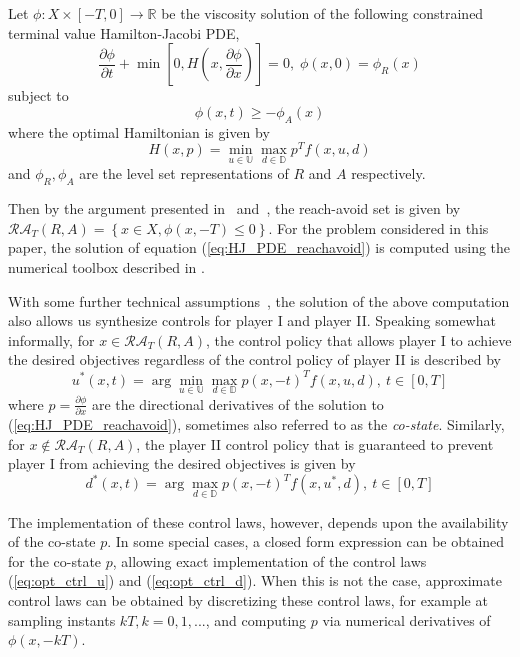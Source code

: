 Let $\phi: X \times [-T,0] \rightarrow \mathbb{R}$ be the viscosity solution of the following constrained terminal value Hamilton-Jacobi PDE,
\begin{equation}
	\label{eq:HJ_PDE_reachavoid}
	\frac{\partial \phi}{\partial t} + \min \left[0, H\left(x,\frac{\partial \phi}{\partial x}\right)\right] = 0,\;\phi(x,0) = \phi_R(x)	 
\end{equation}
subject to 
$$\phi(x,t) \geq -\phi_A(x)$$
where	the optimal Hamiltonian is given by
$$H\left(x,p\right) = \min_{u \in \mathbb{U}} \max_{d \in \mathbb{D}} p^T f(x,u,d)$$
and $\phi_R, \phi_A$ are the level set representations of $R$ and $A$ respectively.

Then by the argument presented in~\cite{j:mitchell-TAC-2005} and~\cite{mitchell-thesis}, the reach-avoid set is given by $\mathcal{RA}_T(R,A) = \left\{x\in X, \phi (x,-T) \leq 0\right\}$.  For the problem considered in this paper, the solution of equation (\ref{eq:HJ_PDE_reachavoid}) is computed using the numerical toolbox described in \cite{j:mitchell-jsc-2008}.

With some further technical assumptions~\cite{j:Lygeros-automatica-1999,j:Tomlin-ProcIEEE-2000}, the solution of the above computation also allows us synthesize controls for player I and player II.  Speaking somewhat informally, for $x \in \mathcal{RA}_T(R,A)$, the control policy that allows player I to achieve the desired objectives regardless of the control policy of player II is described by
\begin{equation}
	\label{eq:opt_ctrl_u}
  u^*(x,t) = \arg \min_{u \in \mathbb{U}} \max_{d \in \mathbb{D}} p(x,-t)^T f(x,u,d), \ t \in [0,T] 
\end{equation}
where $p = \frac{\partial \phi}{\partial x}$ are the directional derivatives of the solution to (\ref{eq:HJ_PDE_reachavoid}), sometimes also referred to as the \emph{co-state}.
Similarly, for $x \notin \mathcal{RA}_T(R,A)$, the player II control policy that is guaranteed to prevent player I from achieving the desired objectives is given by
\begin{equation}
	\label{eq:opt_ctrl_d}
  d^*(x,t) = \arg \max_{d \in \mathbb{D}} p(x,-t)^T f(x,u^*,d), \ t \in [0,T] 
\end{equation}

The implementation of these control laws, however, depends upon the availability of the co-state $p$.  In some special cases, a closed form expression can be obtained for the co-state $p$, allowing exact implementation of the control laws (\ref{eq:opt_ctrl_u}) and (\ref{eq:opt_ctrl_d}).  When this is not the case, approximate control laws can be obtained by discretizing these control laws, for example at sampling instants $kT, k = 0,1,...$, and computing $p$ via numerical derivatives of $\phi(x,-kT)$.  

